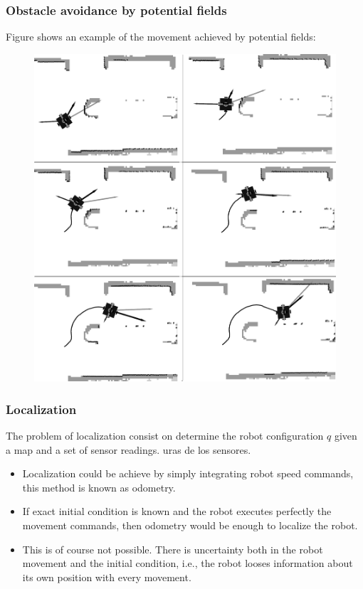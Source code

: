 \begin{frame}\frametitle{Obstacle avoidance by potential fields}
  Figure shows an example of the movement achieved by potential fields:
  \begin{figure}
    \centering
    \includegraphics[height=0.85\textheight]{Figures/MotionPlanning/PotFieldsExecution.png}
  \end{figure}
\end{frame}

\begin{frame}\frametitle{Localization}
  The problem of localization consist on determine the robot configuration $q$ given a map and a set of sensor readings. uras de los sensores.
  \begin{itemize}
  \item Localization could be achieve by simply integrating robot speed commands, this method is known as odometry.
  \item If exact initial condition is known and the robot executes perfectly the movement commands, then odometry would be enough to localize the robot.
  \item This is of course not possible. There is uncertainty both in the robot movement and the initial condition, i.e., the robot looses information about its own position with every movement. 
  \end{itemize}
\end{frame}

